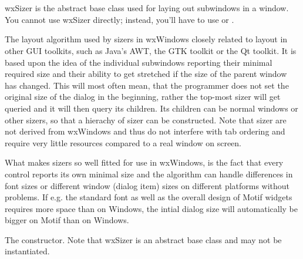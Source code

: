 \section{}\label{wxsizer}

wxSizer is the abstract base class used for laying out subwindows in a window. You
cannot use wxSizer directly; instead, you'll have to use  
or .

The layout algorithm used by sizers in wxWindows closely related to layout
in other GUI toolkits, such as Java's AWT, the GTK toolkit or the Qt toolkit. It is
based upon the idea of the individual subwindows reporting their minimal required
size and their ability to get stretched if the size of the parent window has changed.
This will most often mean, that the programmer does not set the original size of
the dialog in the beginning, rather the top-most sizer will get queried and it will
then query its children. Its children can be normal windows or other sizers, so that
a hierachy of sizer can be constructed. Note that sizer are not derived from wxWindows
and thus do not interfere with tab ordering and require very little resources compared
to a real window on screen.

What makes sizers so well fitted for use in wxWindows, is the fact that every control
reports its own minimal size and the algorithm can handle differences in font sizes
or different window (dialog item) sizes on different platforms without problems. If e.g.
the standard font as well as the overall design of Motif widgets requires more space than
on Windows, the intial dialog size will automatically be bigger on Motif than on Windows.





\label{wxsizerwxsizer}


The constructor. Note that wxSizer is an abstract base class and may not
be instantiated.

\label{wxsizerdtor}

